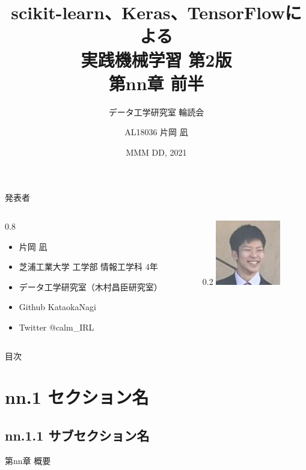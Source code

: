 \documentclass[aspectratio=169, dvipdfmx, 14pt, xcolor={svgnames,dvipsnames}, t]{beamer}
\title[実践機械学習 輪読会 第nn章 前半]{scikit-learn、Keras、TensorFlowによる\\実践機械学習 第2版\\第nn章 前半}
\subtitle{データ工学研究室 輪読会}
\author[片岡 凪]{AL18036 片岡 凪}
\institute[データ工学研究室 B4]{芝浦工業大学 工学部 情報工学科 4年}
\date{MMM DD, 2021}
\newlength{\mytotalwidth}
\newlength{\mycolumnwidth}
\begin{document}

\maketitle


\begin{frame}{発表者}
  \begin{columns}[totalwidth=\mytotalwidth]
    \begin{column}[t]{0.8\mycolumnwidth}
      \begin{itemize}
        \item 片岡 凪
        \item 芝浦工業大学 工学部 情報工学科 4年
        \item データ工学研究室（木村昌臣研究室）
        \item Github  KataokaNagi
        \item Twitter @calm\_IRL
      \end{itemize}
    \end{column}
    \begin{column}[T]{0.2\mycolumnwidth}
      \centering
      \includegraphics[width=80pt]{img/icon.jpg}
    \end{column}
  \end{columns}
\end{frame}


\begin{frame}{目次}
  \tableofcontents
\end{frame}


\section{nn.1 セクション名}
\subsection{nn.1.1 サブセクション名}


\begin{frame}{第nn章 概要}
\end{frame}

\end{document}
